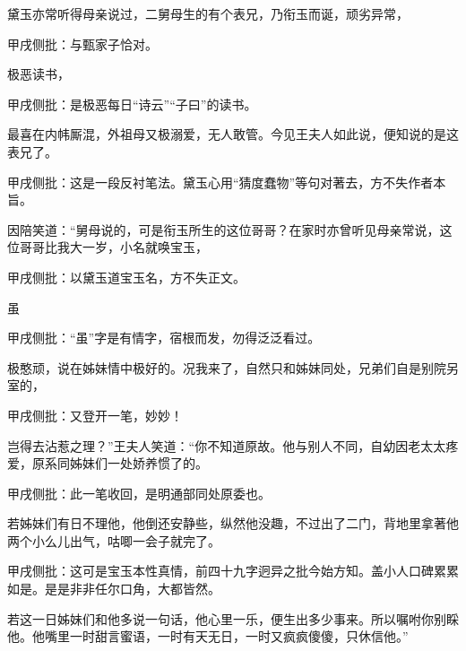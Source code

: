 \begin{parag}
    黛玉亦常听得母亲说过，二舅母生的有个表兄，乃衔玉而诞，顽劣异常，\begin{note}甲戌侧批：与甄家子恰对。\end{note}极恶读书，\begin{note}甲戌侧批：是极恶每日“诗云”“子曰”的读书。\end{note}最喜在内帏厮混，外祖母又极溺爱，无人敢管。今见王夫人如此说，便知说的是这表兄了。\begin{note}甲戌侧批：这是一段反衬笔法。黛玉心用“猜度蠢物”等句对著去，方不失作者本旨。\end{note}因陪笑道：“舅母说的，可是衔玉所生的这位哥哥？在家时亦曾听见母亲常说，这位哥哥比我大一岁，小名就唤宝玉，\begin{note}甲戌侧批：以黛玉道宝玉名，方不失正文。\end{note}虽\begin{note}甲戌侧批：“虽”字是有情字，宿根而发，勿得泛泛看过。\end{note}极憨顽，说在姊妹情中极好的。况我来了，自然只和姊妹同处，兄弟们自是别院另室的，\begin{note}甲戌侧批：又登开一笔，妙妙！\end{note}岂得去沾惹之理？”王夫人笑道：“你不知道原故。他与别人不同，自幼因老太太疼爱，原系同姊妹们一处娇养惯了的。\begin{note}甲戌侧批：此一笔收回，是明通部同处原委也。\end{note}若姊妹们有日不理他，他倒还安静些，纵然他没趣，不过出了二门，背地里拿著他两个小么儿出气，咕唧一会子就完了。\begin{note}甲戌侧批：这可是宝玉本性真情，前四十九字迥异之批今始方知。盖小人口碑累累如是。是是非非任尔口角，大都皆然。\end{note}若这一日姊妹们和他多说一句话，他心里一乐，便生出多少事来。所以嘱咐你别睬他。他嘴里一时甜言蜜语，一时有天无日，一时又疯疯傻傻，只休信他。”
\end{parag}


